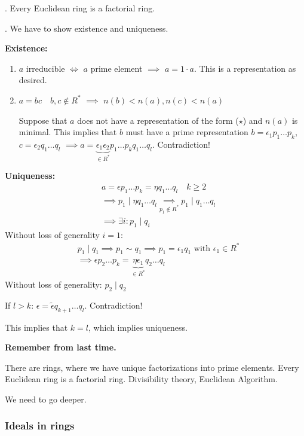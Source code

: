 \Theorem.
Every Euclidean ring is a factorial ring.

\Proof.
We have to show existence and uniqueness.

\textbf{Existence:}
\begin{enumerate}[{Case} 1:]
  \item $a$ irreducible $\Leftrightarrow$ $a$ prime element $\implies$ $a=1\cdot a$. This is a representation as desired.

  \item $a= bc \quad b,c \not\in R^{*}$ $\implies$ $n(b) < n(a), n(c) < n(a)$

  Suppose that $a$ does not have a representation of the form ($\star$) and $n(a)$ is minimal.
  This implies that $b$ must have a prime representation $b = \epsilon_1 p_1 \ldots p_k$, $c = \epsilon_2 q_1 \ldots q_l$
  $\implies a = \underbrace{\epsilon_1 \epsilon_2}_{\in R^{*}} p_1 \ldots p_k q_1 \ldots q_l$. Contradiction!
\end{enumerate}

\textbf{Uniqueness:}
\begin{align*}
  & a = \epsilon p_1 \ldots p_k = \eta q_1 \ldots q_l \quad k\geq 2\\
  & \implies p_1 ∣ \eta q_1 \ldots q_l \underset{p_1 \not\in R^{*}}{\implies}{} p_1 ∣ q_1 \ldots q_l\\
  & \implies \exists i: p_1 ∣ q_i
\end{align*}
Without loss of generality $i = 1$:
\begin{align*}
  & p_1∣q_1 \implies p_1 \sim q_1 \implies p_1 = \epsilon_1 q_1 \text{ with } \epsilon_1 \in R^{*}\\
  & \implies\epsilon p_2 \ldots p_k = \underbrace{\eta \epsilon_1}_{\in R^{*}} q_2 \ldots q_l
\end{align*}
Without loss of generality: $p_2∣q_2$

If $l > k$: $\epsilon = \tilde{\epsilon} q_{k+1} \ldots q_l$. Contradiction!

This implies that $k=l$, which implies uniqueness.


\textbf{Remember from last time.}

There are rings, where we have unique factorizations into prime elements.
Every Euclidean ring is a factorial ring. Divisibility theory, Euclidean Algorithm.

We need to go deeper.

\subsubsection{Ideals in rings}

